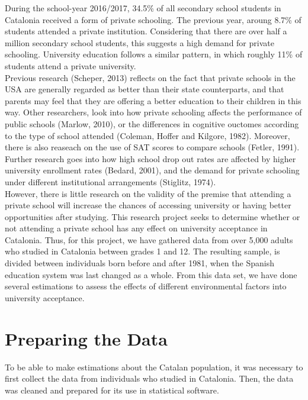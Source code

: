 \documentclass[12pt]{article}
\begin{document}
During the school-year 2016/2017, 34.5\% of all secondary school students in Catalonia received a form of private schooling. The previous year, aroung 8.7\% of students attended a private institution. Considering that there are over half a million secondary school students, this suggests a high demand for private schooling. University education follows a similar pattern, in which roughly 11\% of students attend a private university.\\
Previous research \cite{scheper} (Scheper, 2013) reflects on the fact that private schools in the USA are generally regarded as better than their state counterparts, and that parents may feel that they are offering a better education to their children in this way. Other researchers, look into how private schooling affects the performance of public schools \cite{marlow} (Marlow, 2010), or the differences in cognitive ouctomes according to the type of school attended \cite{coleman} (Coleman, Hoffer and Kilgore, 1982). Moreover, there is also reaseach on the use of SAT scores to compare schools \cite{fetler} (Fetler, 1991). Further research goes into how high school drop out rates are affected by higher university enrollment rates \cite{bedard}(Bedard, 2001), and the demand for private schooling under different institutional arrangements \cite{stiglitz}(Stiglitz, 1974).\\
However, there is little research on the validity of the premise that attending a private school will increase the chances of accessing university or having better opportunities after studying. This research project seeks to determine whether or not attending a private school has any effect on university acceptance in Catalonia. Thus, for this project, we have gathered data from over 5,000 adults who studied in Catalonia between grades 1 and 12. The resulting sample, is divided between individuals born before and after 1981, when the Spanish education system was last changed as a whole. From this data set, we have done several estimations to assess the effects of different environmental factors into university acceptance. 

\section{Preparing the Data}

To be able to make estimations about the Catalan population, it was necessary to first collect the data from individuals who studied in Catalonia. Then, the data was cleaned and prepared for its use in statistical software.
\end{document}
